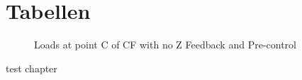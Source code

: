 \chapter{Tabellen}
\label{cha:anhang_tabellen}
\begin{figure}[h!]
	\centering
	\scalebox{0.8}{
		\begin{tikzpicture}
			
	\end{tikzpicture}}
	\caption{Loads at point C of CF with no Z Feedback and Pre-control}
	\label{fig:noZC}
\end{figure}
test chapter

